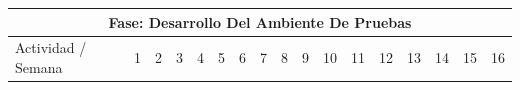 \documentclass[12pt]{article}
\begin{document}
\begin{table}[H]
{\begin{tabular}{|lllllllllllllllll|}
			\multicolumn{17}{|c|}{\cellcolor[HTML]{FFFFC7}Fase: Desarrollo Del Ambiente De Pruebas}                                                                                                                                                                                                                                                                                                                                                                                                                                                                                                                                                                                                                                                                                                                                                                                              \\ \hline
			\multicolumn{1}{|l|}{\cellcolor[HTML]{FFFFC7}Actividad / Semana}                   & \multicolumn{1}{l|}{\cellcolor[HTML]{9AFF99}1} & \multicolumn{1}{l|}{\cellcolor[HTML]{9AFF99}2} & \multicolumn{1}{l|}{\cellcolor[HTML]{9AFF99}3} & \multicolumn{1}{l|}{\cellcolor[HTML]{9AFF99}4} & \multicolumn{1}{l|}{\cellcolor[HTML]{96FFFB}5} & \multicolumn{1}{l|}{\cellcolor[HTML]{96FFFB}6} & \multicolumn{1}{l|}{\cellcolor[HTML]{96FFFB}7} & \multicolumn{1}{l|}{\cellcolor[HTML]{96FFFB}8} & \multicolumn{1}{l|}{\cellcolor[HTML]{CBCEFB}9} & \multicolumn{1}{l|}{\cellcolor[HTML]{CBCEFB}10} & \multicolumn{1}{l|}{\cellcolor[HTML]{CBCEFB}11} & \multicolumn{1}{l|}{\cellcolor[HTML]{CBCEFB}12} & \multicolumn{1}{l|}{\cellcolor[HTML]{FFCCC9}13} & \multicolumn{1}{l|}{\cellcolor[HTML]{FFCCC9}14} & \multicolumn{1}{l|}{\cellcolor[HTML]{FFCCC9}15} &
			\cellcolor[HTML]{FFCCC9}16                                                                                                                                                                                                                                                                                                                                                                                                                                                                                                                                                                                                                                                                                                                                                                                                                                                           \\ \hline

\end{tabular}}
\end{table}
\end{document}
